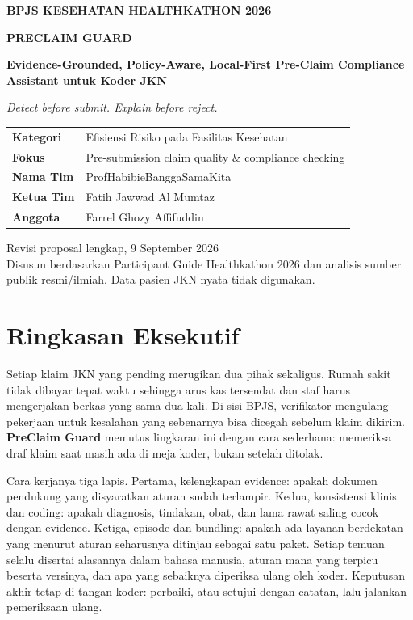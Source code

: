 \documentclass[11pt,a4paper]{article}
\begin{document}
\begin{titlepage}
\centering
{\large\bfseries\color{brandgreen} BPJS KESEHATAN HEALTHKATHON 2026\par}\vspace{1.3cm}
{\Huge\bfseries\color{brandblue} PRECLAIM GUARD\par}\vspace{0.5cm}
{\Large\bfseries Evidence-Grounded, Policy-Aware, Local-First Pre-Claim Compliance Assistant untuk Koder JKN\par}\vspace{0.5cm}
{\large\itshape\color{brandgreen} Detect before submit. Explain before reject.\par}\vspace{1.5cm}
\begin{tabular}{p{4.2cm}p{9.2cm}}\hline
\textbf{Kategori} & Efisiensi Risiko pada Fasilitas Kesehatan \\
\textbf{Fokus} & Pre-submission claim quality \& compliance checking \\
\textbf{Nama Tim} & ProfHabibieBanggaSamaKita \\
\textbf{Ketua Tim} & Fatih Jawwad Al Mumtaz \\
\textbf{Anggota} & Farrel Ghozy Affifuddin \\\hline
\end{tabular}
\vfill
{\small Revisi proposal lengkap, 9 September 2026\\Disusun berdasarkan Participant Guide Healthkathon 2026 dan analisis sumber publik resmi/ilmiah. Data pasien JKN nyata tidak digunakan.}
\end{titlepage}
\tableofcontents\newpage

\section*{Ringkasan Eksekutif}
Setiap klaim JKN yang pending merugikan dua pihak sekaligus. Rumah sakit tidak dibayar tepat waktu sehingga arus kas tersendat dan staf harus mengerjakan berkas yang sama dua kali. Di sisi BPJS, verifikator mengulang pekerjaan untuk kesalahan yang sebenarnya bisa dicegah sebelum klaim dikirim. \textbf{PreClaim Guard} memutus lingkaran ini dengan cara sederhana: memeriksa draf klaim saat masih ada di meja koder, bukan setelah ditolak.

Cara kerjanya tiga lapis. Pertama, kelengkapan evidence: apakah dokumen pendukung yang disyaratkan aturan sudah terlampir. Kedua, konsistensi klinis dan coding: apakah diagnosis, tindakan, obat, dan lama rawat saling cocok dengan evidence. Ketiga, episode dan bundling: apakah ada layanan berdekatan yang menurut aturan seharusnya ditinjau sebagai satu paket. Setiap temuan selalu disertai alasannya dalam bahasa manusia, aturan mana yang terpicu beserta versinya, dan apa yang sebaiknya diperiksa ulang oleh koder. Keputusan akhir tetap di tangan koder: perbaiki, atau setujui dengan catatan, lalu jalankan pemeriksaan ulang.
\end{document}
